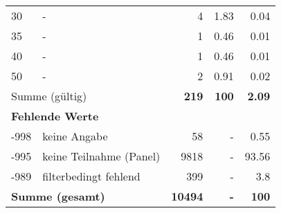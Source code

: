 \begin{longtable}{lXrrr}
     30 &
     \multicolumn{1}{X}{ -  } &


       \num{4} &
       \num[round-mode=places,round-precision=2]{1.83} &
         \num[round-mode=places,round-precision=2]{0.04} \\

     35 &
     \multicolumn{1}{X}{ -  } &


       \num{1} &
       \num[round-mode=places,round-precision=2]{0.46} &
         \num[round-mode=places,round-precision=2]{0.01} \\

     40 &
     \multicolumn{1}{X}{ -  } &


       \num{1} &
       \num[round-mode=places,round-precision=2]{0.46} &
         \num[round-mode=places,round-precision=2]{0.01} \\

     50 &
     \multicolumn{1}{X}{ -  } &


       \num{2} &
       \num[round-mode=places,round-precision=2]{0.91} &
         \num[round-mode=places,round-precision=2]{0.02} \\
     \midrule
     \multicolumn{2}{l}{Summe (gültig)} &
       \textbf{\num{219}} &
     \textbf{\num{100}} &
       \textbf{\num[round-mode=places,round-precision=2]{2.09}} \\
     \multicolumn{5}{l}{\textbf{Fehlende Werte}}\\
       -998 &
       keine Angabe &
         \num{58} &
        - &
         \num[round-mode=places,round-precision=2]{0.55} \\
       -995 &
       keine Teilnahme (Panel) &
         \num{9818} &
        - &
         \num[round-mode=places,round-precision=2]{93.56} \\
       -989 &
       filterbedingt fehlend &
         \num{399} &
        - &
         \num[round-mode=places,round-precision=2]{3.8} \\
     \midrule
     \multicolumn{2}{l}{\textbf{Summe (gesamt)}} &
          \textbf{\num{10494}} &
        \textbf{-} &
        \textbf{\num{100}} \\
     \bottomrule
     \end{longtable}
     
